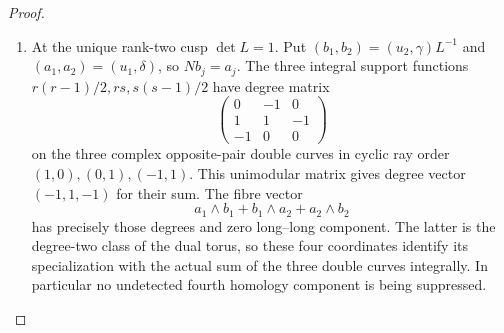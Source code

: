 \begin{proof}
\begin{enumerate}[label=\arabic*.,leftmargin=*]
\item At the unique rank-two cusp $\det L=1$. Put
$(b_1,b_2)=(u_2,\gamma)L^{-1}$ and $(a_1,a_2)=(u_1,\delta)$,
so $Nb_j=a_j$. The three integral support functions
$r(r-1)/2,rs,s(s-1)/2$ have degree matrix
\[
 \begin{pmatrix}0&-1&0\\1&1&-1\\-1&0&0\end{pmatrix}          \tag{D44.11}\label{maps:eq:D44.11}
\]
on the three complex opposite-pair double curves in cyclic
ray order $(1,0),(0,1),(-1,1)$. This unimodular matrix gives
degree vector $(-1,1,-1)$ for their sum. The fibre vector
\[
 a_1\wedge b_1+b_1\wedge a_2+a_2\wedge b_2                  \tag{D44.12}\label{maps:eq:D44.12}
\]
has precisely those degrees and zero long--long component.
The latter is the degree-two class of the dual torus, so these
four coordinates identify its specialization with the actual
sum of the three double curves integrally. In particular no
undetected fourth homology component is being suppressed.


\end{enumerate}
\end{proof}
